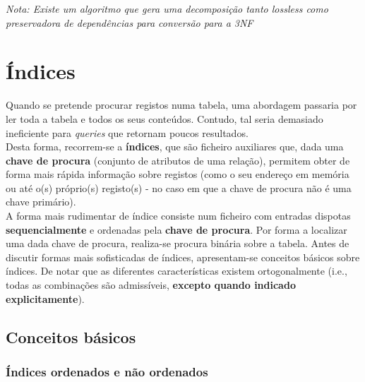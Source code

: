 \documentclass[oneside]{book}
\theoremstyle{definition}
\begin{document}
\textit{Nota: Existe um algoritmo que gera uma decomposição tanto lossless como preservadora de dependências para conversão para a 3NF}



\chapter{Índices}

Quando se pretende procurar registos numa tabela, uma abordagem passaria por ler toda a tabela e todos os seus conteúdos. Contudo, tal seria demasiado ineficiente para \textit{queries} que retornam poucos resultados. \\
Desta forma, recorrem-se a \textbf{índices}, que são ficheiro auxiliares que, dada uma \textbf{chave de procura} (conjunto de atributos de uma relação), permitem obter de forma mais rápida informação sobre registos (como o seu endereço em memória ou até o(s) próprio(s) registo(s) - no caso em que a chave de procura não é uma chave primário).\\
A forma mais rudimentar de índice consiste num ficheiro com entradas dispotas \textbf{sequencialmente} e ordenadas pela \textbf{chave de procura}. Por forma a localizar uma dada chave de procura, realiza-se procura binária sobre a tabela. Antes de discutir formas mais sofisticadas de índices, apresentam-se conceitos básicos sobre índices. De notar que as diferentes características existem ortogonalmente (i.e., todas as combinações são admissíveis, \textbf{excepto quando indicado explicitamente}).

\section{Conceitos básicos}

\subsection{Índices ordenados e não ordenados}
 
\end{document}
